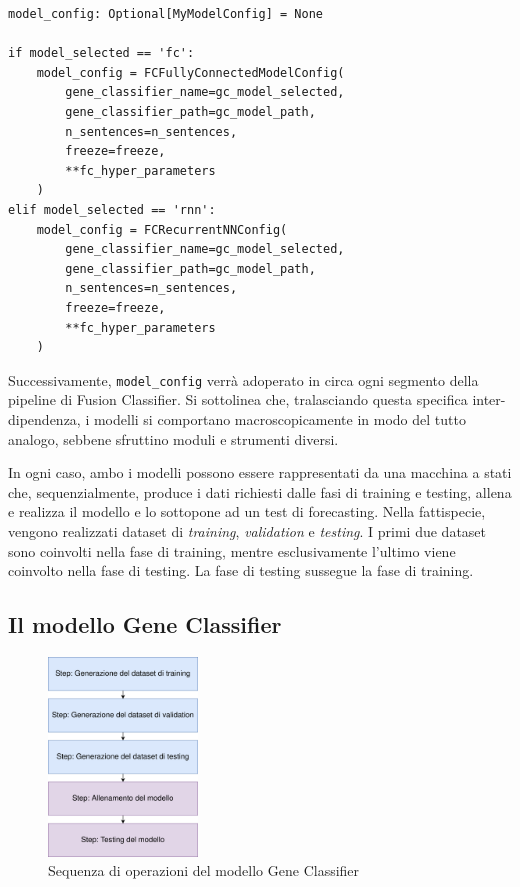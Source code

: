 \begin{code}
\label{code:apx:a:python}
\begin{verbatim}
model_config: Optional[MyModelConfig] = None

if model_selected == 'fc':
    model_config = FCFullyConnectedModelConfig(
        gene_classifier_name=gc_model_selected,
        gene_classifier_path=gc_model_path,
        n_sentences=n_sentences,
        freeze=freeze,
        **fc_hyper_parameters
    )
elif model_selected == 'rnn':
    model_config = FCRecurrentNNConfig(
        gene_classifier_name=gc_model_selected,
        gene_classifier_path=gc_model_path,
        n_sentences=n_sentences,
        freeze=freeze,
        **fc_hyper_parameters
    )
\end{verbatim}
\end{code}

Successivamente, {\small \verb|model_config|} verrà adoperato in circa ogni segmento della pipeline di Fusion Classifier. Si sottolinea che, tralasciando questa specifica inter-dipendenza, i modelli si comportano macroscopicamente in modo del tutto analogo, sebbene sfruttino moduli e strumenti diversi.

In ogni caso, ambo i modelli possono essere rappresentati da una macchina a stati che, sequenzialmente, produce i dati richiesti dalle fasi di training e testing, allena e realizza il modello e lo sottopone ad un test di forecasting. Nella fattispecie, vengono realizzati dataset di {\em training}, {\em validation} e {\em testing}. I primi due dataset sono coinvolti nella fase di training, mentre esclusivamente l'ultimo viene coinvolto nella fase di testing. La fase di testing sussegue la fase di training.

\subsection{Il modello Gene Classifier}

\begin{figure}[h]
    \centering
    \includegraphics[width=150px]{figures/ch2/gene_stati.png}
    \caption[Sequenza di operazioni del modello Gene Classifier]{Sequenza di operazioni del modello Gene Classifier}
    \label{fig:cha2:gene_stati}
\end{figure}


